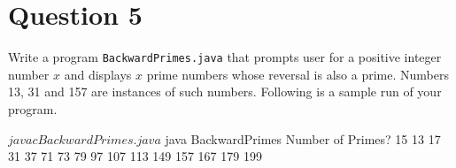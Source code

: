 \newpage

\section*{Question 5}
Write a program \texttt{BackwardPrimes.java} that prompts user for a positive integer number $x$ and displays $x$ prime numbers whose reversal is also a prime.
Numbers 13, 31 and 157 are instances of such numbers.
Following is a sample run of your program.

\begin{terminal}
$ javac BackwardPrimes.java
$ java BackwardPrimes
Number of Primes? 15
13 17 31 37 71 73 79 97 107 113 149 157 167 179 199
\end{terminal}
